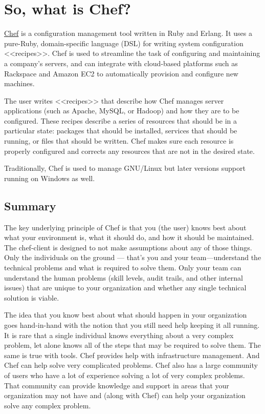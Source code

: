 \chapter{So, what is Chef?}

\begin{figure}[ht!]
  \label{fig:chef_logo}
\end{figure}

\href{http://www.getchef.com/}{Chef} is a configuration management tool written in Ruby and Erlang. It uses a pure-Ruby, domain-specific language (DSL) for writing system configuration <<recipes>>. Chef is used to streamline the task of configuring and maintaining a company's servers, and can integrate with cloud-based platforms such as Rackspace and Amazon EC2 to automatically provision and configure new machines.

The user writes <<recipes>> that describe how Chef manages server applications (such as Apache, MySQL, or Hadoop) and how they are to be configured. These recipes describe a series of resources that should be in a particular state: packages that should be installed, services that should be running, or files that should be written. Chef makes sure each resource is properly configured and corrects any resources that are not in the desired state.

Traditionally, Chef is used to manage GNU/Linux but later versions support running on Windows as well.




\section{Summary}

The key underlying principle of Chef is that you (the user) knows best about what your environment is, what it should do, and how it should be maintained. The chef-client is designed to not make assumptions about any of those things. Only the individuals on the ground — that's you and your team—understand the technical problems and what is required to solve them. Only your team can understand the human problems (skill levels, audit trails, and other internal issues) that are unique to your organization and whether any single technical solution is viable.

The idea that you know best about what should happen in your organization goes hand-in-hand with the notion that you still need help keeping it all running. It is rare that a single individual knows everything about a very complex problem, let alone knows all of the steps that may be required to solve them. The same is true with tools. Chef provides help with infrastructure management. And Chef can help solve very complicated problems. Chef also has a large community of users who have a lot of experience solving a lot of very complex problems. That community can provide knowledge and support in areas that your organization may not have and (along with Chef) can help your organization solve any complex problem.